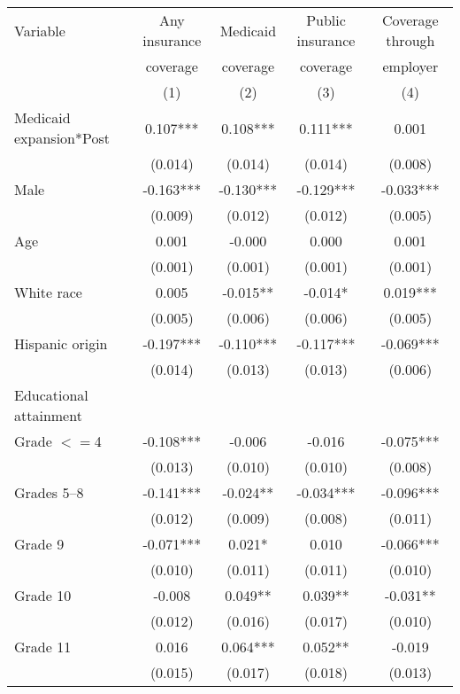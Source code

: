 \begin{tabular}{lcccc}
\toprule
\toprule
 Variable & Any insurance & Medicaid & Public insurance & Coverage through \\
  & coverage & coverage & coverage &  employer \\
  & (1) & (2) & (3) &  (4) \\
\midrule 
 Medicaid expansion*Post   & 0.107***   & 0.108***   & 0.111***   & 0.001  \\
 & (0.014)   & (0.014)   & (0.014)   & (0.008)  \\
 Male   & -0.163***   & -0.130***   & -0.129***   & -0.033***  \\
 & (0.009)   & (0.012)   & (0.012)   & (0.005)  \\
 Age   & 0.001   & -0.000   & 0.000   & 0.001  \\
 & (0.001)   & (0.001)   & (0.001)   & (0.001)  \\
 White race   & 0.005   & -0.015**   & -0.014*   & 0.019***  \\
 & (0.005)   & (0.006)   & (0.006)   & (0.005)  \\
 Hispanic origin   & -0.197***   & -0.110***   & -0.117***   & -0.069***  \\
 & (0.014)   & (0.013)   & (0.013)   & (0.006)  \\
 Educational attainment  \\
 \hspace{0.3cm} Grade $<=$4   & -0.108***   & -0.006   & -0.016   & -0.075***  \\
 & (0.013)   & (0.010)   & (0.010)   & (0.008)  \\
 \hspace{0.3cm}  Grades 5--8   & -0.141***   & -0.024**   & -0.034***   & -0.096***  \\
 & (0.012)   & (0.009)   & (0.008)   & (0.011)  \\
 \hspace{0.3cm} Grade 9   & -0.071***   & 0.021*   & 0.010   & -0.066***  \\
 & (0.010)   & (0.011)   & (0.011)   & (0.010)  \\
 \hspace{0.3cm} Grade 10   & -0.008   & 0.049**   & 0.039**   & -0.031**  \\
 & (0.012)   & (0.016)   & (0.017)   & (0.010)  \\
 \hspace{0.3cm} Grade 11   & 0.016   & 0.064***   & 0.052**   & -0.019  \\
 & (0.015)   & (0.017)   & (0.018)   & (0.013)  \\

\end{tabular}

